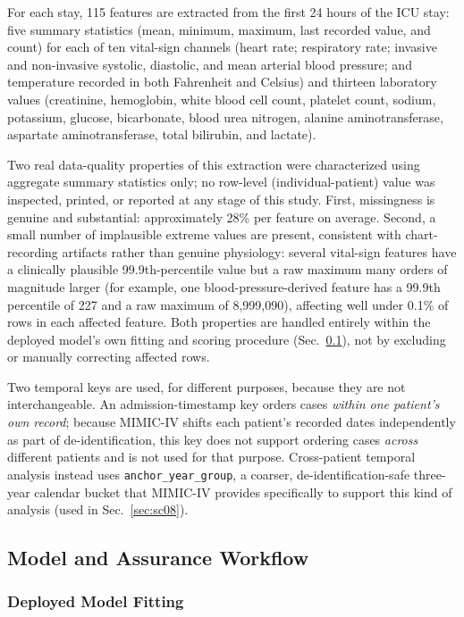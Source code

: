 \documentclass[apajournal,article,submit,oneauthor]{Definitions/mdpi}
\begin{document}
For each stay, 115 features are extracted from the first 24 hours of the ICU stay: five summary statistics (mean, minimum, maximum, last recorded value, and count) for each of ten vital-sign channels (heart rate; respiratory rate; invasive and non-invasive systolic, diastolic, and mean arterial blood pressure; and temperature recorded in both Fahrenheit and Celsius) and thirteen laboratory values (creatinine, hemoglobin, white blood cell count, platelet count, sodium, potassium, glucose, bicarbonate, blood urea nitrogen, alanine aminotransferase, aspartate aminotransferase, total bilirubin, and lactate).

Two real data-quality properties of this extraction were characterized using aggregate summary statistics only; no row-level (individual-patient) value was inspected, printed, or reported at any stage of this study. First, missingness is genuine and substantial: approximately 28\% per feature on average. Second, a small number of implausible extreme values are present, consistent with chart-recording artifacts rather than genuine physiology: several vital-sign features have a clinically plausible 99.9th-percentile value but a raw maximum many orders of magnitude larger (for example, one blood-pressure-derived feature has a 99.9th percentile of 227 and a raw maximum of 8{,}999{,}090), affecting well under 0.1\% of rows in each affected feature. Both properties are handled entirely within the deployed model's own fitting and scoring procedure (Sec.~\ref{sec:model}), not by excluding or manually correcting affected rows.

Two temporal keys are used, for different purposes, because they are not interchangeable. An admission-timestamp key orders cases \emph{within one patient's own record}; because MIMIC-IV shifts each patient's recorded dates independently as part of de-identification, this key does not support ordering cases \emph{across} different patients and is not used for that purpose. Cross-patient temporal analysis instead uses \texttt{anchor\_year\_group}, a coarser, de-identification-safe three-year calendar bucket that MIMIC-IV provides specifically to support this kind of analysis (used in Sec.~\ref{sec:sc08}).

\subsection{Model and Assurance Workflow}\label{sec:model}

\subsubsection{Deployed Model Fitting}
\end{document}
